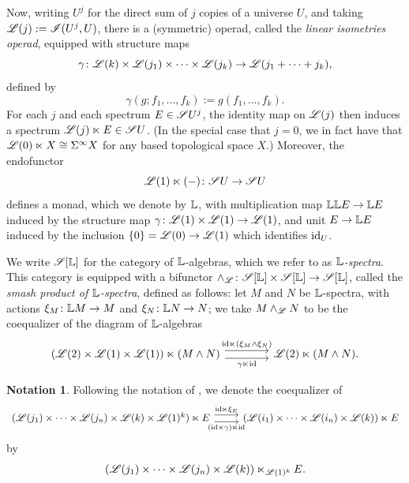 \documentclass[openany, amssymb, psamsfonts]{amsart}
\theoremstyle{definition}
\newtheorem{notn}{Notation}[section]
\numberwithin{equation}{section}
\begin{document}
Now, writing $U^j$ for the direct sum of $j$ copies of a universe $U$, and taking $\mathscr{L}(j) := \mathscr{I}(U^j, U)$, there is a (symmetric) operad, called the \emph{linear isometries operad}, equipped with structure maps
\begin{equation*}
    \gamma \colon \mathscr{L}(k) \times \mathscr{L}(j_1) \times \cdots \times \mathscr{L}(j_k) \to \mathscr{L}(j_1 + \cdots + j_k),
\end{equation*} defined by
\begin{equation*}
    \gamma(g; f_1, \dots, f_k) := g (f_1, \dots, f_k).
\end{equation*} For each $j$ and each spectrum $E \in \mathscr{S} U^j$, the identity map on $\mathscr{L}(j)$ then induces a spectrum $\mathscr{L}(j) \ltimes E \in \mathscr{S} U$. (In the special case that $j = 0$, we in fact have that $\mathscr{L}(0) \ltimes X \cong \Sigma^\infty X$ for any based topological space $X$.) Moreover, the endofunctor
\begin{equation*}
    \mathscr{L}(1) \ltimes (-) \colon \mathscr{S} U \to \mathscr{S} U
\end{equation*} defines a monad, which we denote by $\mathbb{L}$, with multiplication map $\mathbb{L} \mathbb{L} E \to \mathbb{L} E$ induced by the structure map $\gamma \colon \mathscr{L}(1) \times \mathscr{L}(1) \to \mathscr{L}(1)$, and unit $E \to \mathbb{L} E$ induced by the inclusion $\{0\} = \mathscr{L}(0) \to \mathscr{L}(1)$ which identifies $\mathrm{id}_U$. 

We write $\mathscr{S}[\mathbb{L}]$ for the category of $\mathbb{L}$-algebras, which we refer to as \emph{$\mathbb{L}$-spectra}. This category is equipped with a bifunctor $\wedge_{\mathscr{L}} \colon \mathscr{S}[\mathbb{L}] \times \mathscr{S}[\mathbb{L}] \to \mathscr{S}[\mathbb{L}]$, called the \emph{smash product of $\mathbb{L}$-spectra}, defined as follows: let $M$ and $N$ be $\mathbb{L}$-spectra, with actions $\xi_M \colon \mathbb{L} M \to M$ and $\xi_N \colon \mathbb{L} N \to N$; we take $M \wedge_{\mathscr{L}} N $ to be the coequalizer of the diagram of $\mathbb{L}$-algebras
\begin{equation*}
    \begin{tikzcd}[column sep = 4em]
        (\scL(2) \times \scL(1) \times \scL(1)) \ltimes (M \wedge N) \ar[r, shift right = 0.35em, "\gamma \ltimes \id"'] \ar[r, shift left = 0.35em, "\id \ltimes (\xi_M \wedge \xi_N)"] & \scL(2) \ltimes (M \wedge N).
    \end{tikzcd}
\end{equation*} 

\begin{notn}
    Following the notation of \cite{EKMM}, we denote the coequalizer of
    \begin{equation*}
    \begin{tikzcd}
        (\scL(j_1) \times \cdots \times \scL(j_n) \times \scL(k) \times \scL(1)^k) \ltimes E \ar[r, shift right = 0.35em, "(\id \times \gamma) \ltimes \id"'] \ar[r, shift left = 0.35em, "\id \ltimes \xi_E"] & (\scL(i_1) \times \cdots \times \scL(i_n) \times \scL(k)) \ltimes E
    \end{tikzcd}
    \end{equation*}by
    \begin{equation*}
        (\mathscr{L}(j_1) \times \cdots \times \mathscr{L}(j_n) \times \mathscr{L}(k)) \ltimes_{\mathscr{L}(1)^k} E.
    \end{equation*}
\end{notn}
\end{document}
